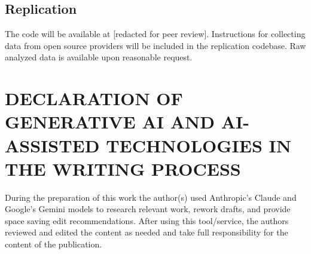 \documentclass{ifacconf}
\begin{document}
\subsection{Replication}
\label{sec:replication}
The code will be available at [redacted for peer review]. Instructions for collecting data from open source providers will be included in the replication codebase. Raw analyzed data is available upon reasonable request.

\section*{DECLARATION OF GENERATIVE AI AND AI-ASSISTED TECHNOLOGIES IN THE WRITING PROCESS}
During the preparation of this work the author(s) used Anthropic's Claude and Google's Gemini models to research relevant work, rework drafts, and provide space saving edit recommendations. After using this tool/service, the authors reviewed and edited the content as needed and take full responsibility for the content of the publication.





\end{document}
